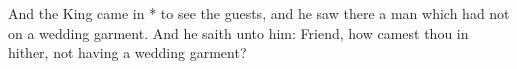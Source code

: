 And the King came in * to see the guests, and he saw there a man which had not on a wedding garment. And he saith unto him: Friend, how camest thou in hither, not having a wedding garment?